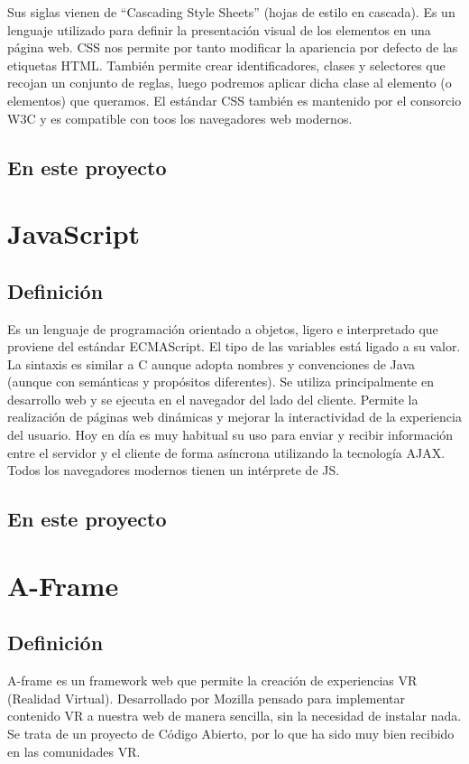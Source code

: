 \documentclass[a4paper, 12pt]{book}
\begin{document}
Sus siglas vienen de “Cascading Style Sheets” (hojas de estilo en cascada). Es un lenguaje utilizado para definir la presentación visual de los elementos en una página web. CSS nos permite por tanto modificar la apariencia por defecto de las etiquetas HTML. También permite crear identificadores, clases y selectores que recojan un conjunto de reglas, luego podremos aplicar dicha clase al elemento (o elementos) que queramos. El estándar CSS también es mantenido por el consorcio W3C y es compatible con toos los navegadores web modernos.

\subsection{En este proyecto}


\section{JavaScript}
\label{sec:js}
\subsection{Definici\'on}
Es un lenguaje de programación orientado a objetos, ligero e interpretado que proviene del estándar ECMAScript.  El tipo de las variables está ligado a su valor. La sintaxis es similar a C aunque adopta nombres y convenciones de Java (aunque con semánticas y propósitos diferentes). Se utiliza principalmente en desarrollo web y se ejecuta en el navegador del lado del cliente. Permite la realización de páginas web dinámicas y mejorar la interactividad de la experiencia del usuario. Hoy en día es muy habitual su uso para enviar y recibir información entre el servidor y el cliente de forma asíncrona utilizando la tecnología AJAX. Todos los navegadores modernos tienen un intérprete de JS.
\subsection{En este proyecto}


\section{A-Frame}
\label{sec:aframe}
\subsection{Definici\'on}
A-frame es un framework web que permite la creaci\'on de experiencias VR (Realidad Virtual). Desarrollado por Mozilla pensado para implementar contenido VR a nuestra web de manera sencilla, sin la necesidad de instalar nada. Se trata de un proyecto de C\'odigo Abierto, por lo que ha sido muy bien recibido en las comunidades VR.
\end{document}
